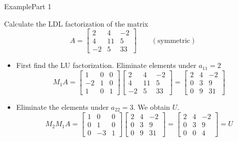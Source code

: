 \documentclass[10pt]{beamer}
\begin{document}

\begin{frame}{Example}{Part 1}

\begin{example}
Calculate the LDL factorization of the matrix
\[ 
A=\begin{bmatrix}
2 & 4 & -2\\
4 & 11 & 5\\
-2 & 5 & 33
\end{bmatrix}
\qquad(\text{symmetric})
\]
\end{example}
\begin{itemize}
    \item First find the LU factorization. Eliminate elements under $a_{11}=2$
    $$
    M_1A = \begin{bmatrix}
        1 & 0 & 0\\
        -2 & 1 & 0 \\
        1 & 0 & 1
    \end{bmatrix}\begin{bmatrix}
    \boxed{2} & 4 & -2\\
    4 & 11 & 5\\
    -2 & 5 & 33
    \end{bmatrix}=\begin{bmatrix}
        2 & 4 & -2\\
        0 & 3 & 9\\
        0 & 9 & 31
    \end{bmatrix}
    $$
    \item Eliminate the elements under $a_{22}=3$. We obtain $U$.
    $$
    M_2M_1A = \begin{bmatrix}
        1 & 0 & 0\\
        0 & 1 & 0 \\
        0 & -3 & 1
    \end{bmatrix}\begin{bmatrix}
        2 & 4 & -2\\
        0 & \boxed{3} & 9\\
        0 & 9 & 31
    \end{bmatrix}=\begin{bmatrix}
        2 & 4 & -2\\
        0 & 3 & 9\\
        0 & 0 & 4
    \end{bmatrix}=U
    $$
\end{itemize}
\end{frame}
\end{document}
